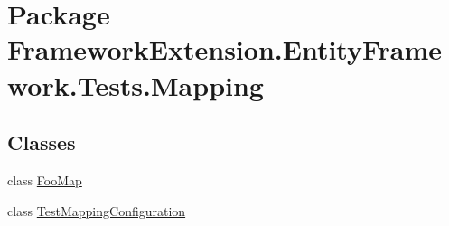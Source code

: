 \hypertarget{namespace_framework_extension_1_1_entity_framework_1_1_tests_1_1_mapping}{\section{Package Framework\-Extension.\-Entity\-Framework.\-Tests.\-Mapping}
\label{namespace_framework_extension_1_1_entity_framework_1_1_tests_1_1_mapping}
}
\subsection*{Classes}
\begin{DoxyCompactItemize}
\item 
class \hyperlink{class_framework_extension_1_1_entity_framework_1_1_tests_1_1_mapping_1_1_foo_map}{Foo\-Map}
\item 
class \hyperlink{class_framework_extension_1_1_entity_framework_1_1_tests_1_1_mapping_1_1_test_mapping_configuration}{Test\-Mapping\-Configuration}
\end{DoxyCompactItemize}
